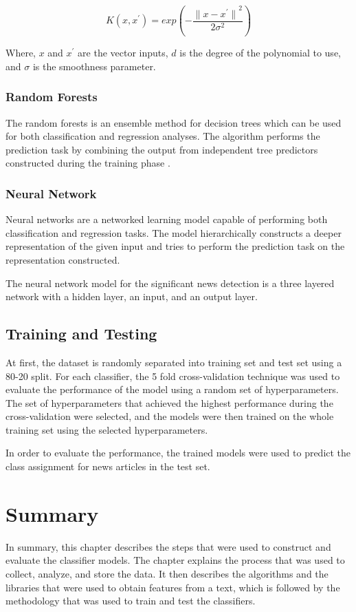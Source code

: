 \begin{equation}
    \label{eq:rbf_kernel}
    K(x, x^{'}) = exp(- \frac{{\lVert x - x^{'} \rVert}^{2}}{2 \sigma^{2}})
\end{equation}

\noindent
Where, $x$ and $x^{'}$ are the vector inputs, $d$ is the degree of the polynomial to use, and $\sigma$ is the smoothness parameter.

\subsubsection{Random Forests}
The random forests\cite{breiman2001random} is an ensemble method for decision trees\cite{quinlan1986induction} which can be used for both classification and regression analyses. The algorithm performs the prediction task by combining the output from independent tree predictors constructed during the training phase \cite{breiman2001random}. 

\subsubsection{Neural Network}
Neural networks are a networked learning model capable of performing both classification and regression tasks. The model hierarchically constructs a deeper representation of the given input and tries to perform the prediction task on the representation constructed. 

The neural network model for the significant news detection is a three layered network with a hidden layer, an input, and an output layer.

\subsection{Training and Testing}
At first, the dataset is randomly separated into training set and test set using a 80-20 split. For each classifier, the 5 fold cross-validation technique was used to evaluate the performance of the model using a random set of hyperparameters. The set of hyperparameters that achieved the highest performance during the cross-validation were selected, and the models were then trained on the whole training set using the selected hyperparameters.

In order to evaluate the performance, the trained models were used to predict the class assignment for news articles in the test set. 

\section{Summary}
In summary, this chapter describes the steps that were used to construct and evaluate the classifier models. The chapter explains the process that was used to collect, analyze, and store the data. It then describes the algorithms and the libraries that were used to obtain features from a text, which is followed by the methodology that was used to train and test the classifiers.
